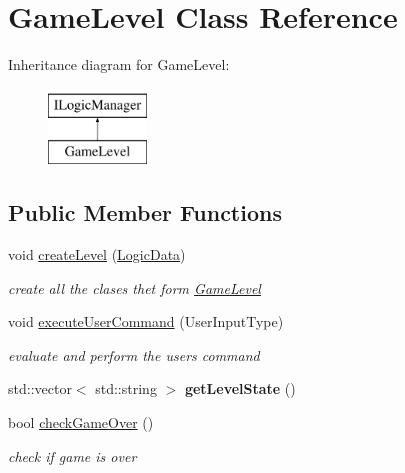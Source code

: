 \hypertarget{class_game_level}{}\section{Game\+Level Class Reference}
\label{class_game_level}
Inheritance diagram for Game\+Level\+:\begin{figure}[H]
\begin{center}
\leavevmode
\includegraphics[height=2.000000cm]{class_game_level}
\end{center}
\end{figure}
\subsection*{Public Member Functions}
\begin{DoxyCompactItemize}
\item 
void \mbox{\hyperlink{class_game_level_a4e520fb697c9f7f62daf02b37c31123c}{create\+Level}} (\mbox{\hyperlink{class_logic_data}{Logic\+Data}})
\begin{DoxyCompactList}\small\item\em create all the clases thet form \mbox{\hyperlink{class_game_level}{Game\+Level}} \end{DoxyCompactList}\item 
void \mbox{\hyperlink{class_game_level_a53cd899aa9aeaf3e9579ff32598b0043}{execute\+User\+Command}} (User\+Input\+Type)
\begin{DoxyCompactList}\small\item\em evaluate and perform the user\textquotesingle{}s command \end{DoxyCompactList}\item 
\mbox{\label{class_game_level_a057f1b02b0706b60980559badaba4cbf}} 
std\+::vector$<$ std\+::string $>$ {\bfseries get\+Level\+State} ()
\item 
bool \mbox{\hyperlink{class_game_level_a5abb06b252b4593608aae90dac77d7cd}{check\+Game\+Over}} ()
\begin{DoxyCompactList}\small\item\em check if game is over \end{DoxyCompactList}\end{DoxyCompactItemize}


